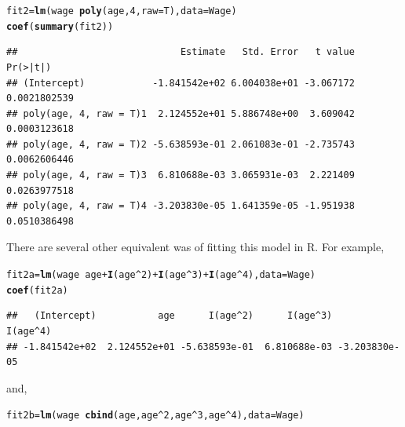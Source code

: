 \documentclass[12pt]{article}\usepackage[]{graphicx}\usepackage[]{color}
\makeatletter
\newcommand{\hlnum}[1]{\textcolor[rgb]{0.686,0.059,0.569}{#1}}%
\newcommand{\hlopt}[1]{\textcolor[rgb]{0,0,0}{#1}}%
\newcommand{\hlstd}[1]{\textcolor[rgb]{0.345,0.345,0.345}{#1}}%
\newcommand{\hlkwb}[1]{\textcolor[rgb]{0.69,0.353,0.396}{#1}}%
\newcommand{\hlkwc}[1]{\textcolor[rgb]{0.333,0.667,0.333}{#1}}%
\newcommand{\hlkwd}[1]{\textcolor[rgb]{0.737,0.353,0.396}{\textbf{#1}}}%
\newenvironment{kframe}{%
 \def\at@end@of@kframe{}%
 \ifinner\ifhmode%
  \def\at@end@of@kframe{\end{minipage}}%
  \begin{minipage}{\columnwidth}%
 \fi\fi%
 \def\FrameCommand##1{\hskip\@totalleftmargin \hskip-\fboxsep
 \colorbox{shadecolor}{##1}\hskip-\fboxsep
     \hskip-\linewidth \hskip-\@totalleftmargin \hskip\columnwidth}%
 \MakeFramed {\advance\hsize-\width
   \@totalleftmargin\z@ \linewidth\hsize
   \@setminipage}}%
 {\par\unskip\endMakeFramed%
 \at@end@of@kframe}
\newenvironment{knitrout}{}{} %
\makeatother
\begin{document}
\begin{knitrout}
\color{fgcolor}\begin{kframe}
\begin{alltt}
\hlstd{fit2}\hlkwb{=}\hlkwd{lm}\hlstd{(wage}\hlopt{~}\hlkwd{poly}\hlstd{(age,}\hlnum{4}\hlstd{,}\hlkwc{raw}\hlstd{=T),}\hlkwc{data}\hlstd{=Wage)}
\hlkwd{coef}\hlstd{(}\hlkwd{summary}\hlstd{(fit2))}
\end{alltt}
\begin{verbatim}
##                             Estimate   Std. Error   t value     Pr(>|t|)
## (Intercept)            -1.841542e+02 6.004038e+01 -3.067172 0.0021802539
## poly(age, 4, raw = T)1  2.124552e+01 5.886748e+00  3.609042 0.0003123618
## poly(age, 4, raw = T)2 -5.638593e-01 2.061083e-01 -2.735743 0.0062606446
## poly(age, 4, raw = T)3  6.810688e-03 3.065931e-03  2.221409 0.0263977518
## poly(age, 4, raw = T)4 -3.203830e-05 1.641359e-05 -1.951938 0.0510386498
\end{verbatim}
\end{kframe}
\end{knitrout}

There are several other equivalent was of fitting this model in R. For example,

\begin{knitrout}
\color{fgcolor}\begin{kframe}
\begin{alltt}
\hlstd{fit2a} \hlkwb{=} \hlkwd{lm}\hlstd{(wage}\hlopt{~}\hlstd{age}\hlopt{+}\hlkwd{I}\hlstd{(age}\hlopt{^}\hlnum{2}\hlstd{)}\hlopt{+}\hlkwd{I}\hlstd{(age}\hlopt{^}\hlnum{3}\hlstd{)}\hlopt{+}\hlkwd{I}\hlstd{(age}\hlopt{^}\hlnum{4}\hlstd{),} \hlkwc{data}\hlstd{=Wage)}
\hlkwd{coef}\hlstd{(fit2a)}
\end{alltt}
\begin{verbatim}
##   (Intercept)           age      I(age^2)      I(age^3)      I(age^4) 
## -1.841542e+02  2.124552e+01 -5.638593e-01  6.810688e-03 -3.203830e-05
\end{verbatim}
\end{kframe}
\end{knitrout}

and,

\begin{knitrout}
\color{fgcolor}\begin{kframe}
\begin{alltt}
\hlstd{fit2b} \hlkwb{=} \hlkwd{lm}\hlstd{(wage}\hlopt{~}\hlkwd{cbind}\hlstd{(age, age}\hlopt{^}\hlnum{2}\hlstd{, age}\hlopt{^}\hlnum{3}\hlstd{, age}\hlopt{^}\hlnum{4}\hlstd{),} \hlkwc{data} \hlstd{= Wage)}
\end{alltt}
\end{kframe}
\end{knitrout}
\end{document}
